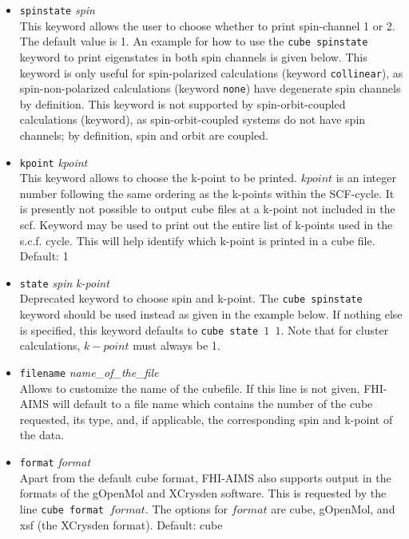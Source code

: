 \begin{itemize}
\item {} \texttt{spinstate} \textit{spin} \\
This keyword allows the user to choose whether to print spin-channel 1 or 2. The
default value is 1.  An example for how to use the \texttt{cube spinstate} keyword
to print eigenstates in both spin channels is given below.  This keyword is only
useful for spin-polarized calculations (keyword \texttt{collinear}), as
spin-non-polarized calculations (keyword \texttt{none}) have degenerate
spin channels by definition.  This keyword is not supported by spin-orbit-coupled
calculations (keyword), as spin-orbit-coupled systems do not
have spin channels; by definition, spin and orbit are coupled.

\item {} \texttt{kpoint} \textit{kpoint} \\
This keyword allows to choose the k-point to be printed.
$kpoint$ is an integer number following the same ordering
as the k-points within the SCF-cycle. It is presently not
possible to output cube files at a k-point not included in the scf.
Keyword   may be
used to print out the entire list of k-points used in the s.c.f. cycle.
This will help identify which k-point is printed in a cube file.
Default: 1

\item {} \texttt{state} \textit{spin} \textit{k-point} \\
Deprecated keyword to choose spin and k-point.
The \texttt{cube spinstate} keyword
should be used instead as given in the example below.
If nothing else is specified, this keyword defaults to
\texttt{cube state $1$ $1$}. Note that for cluster
calculations, $k-point$ must always be 1.

\item {} \texttt{filename} \textit{name\_of\_the\_file} \\
Allows to customize the name of the cubefile. If this line is not given, FHI-AIMS
will default to a file name which contains the number of the cube requested, its
type, and, if applicable, the corresponding spin and k-point of the data.

\item {} \texttt{format} \textit{format} \\
Apart from the default cube format, FHI-AIMS also supports output
in the formats of the gOpenMol and XCrysden software. This is requested by the line
\texttt{cube format $format$}. The options for $format$ are cube,
gOpenMol, and xsf (the XCrysden format). Default: cube


\end{itemize}
